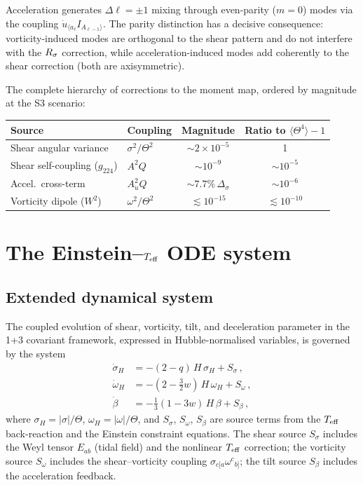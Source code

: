 Acceleration generates $\Delta\ell = \pm 1$ mixing through
even-parity ($m = 0$) modes via the coupling
$\dot{u}_{\langle a_\ell} I_{A_{\ell-1}\rangle}$.  The parity
distinction has a decisive consequence: vorticity-induced modes
are orthogonal to the shear pattern and do not interfere with
the $R_\sigma$ correction, while acceleration-induced modes add
coherently to the shear correction (both are axisymmetric).

The complete hierarchy of corrections to the moment map, ordered
by magnitude at the S3 scenario:
\begin{center}\footnotesize
\begin{tabular}{llcc}
\toprule
Source & Coupling & Magnitude
  & Ratio to $\langle\Theta^4\rangle - 1$ \\
\midrule
Shear angular variance & $\sigma^2/\Theta^2$ &
  $\sim 2 \times 10^{-5}$ & 1 \\
Shear self-coupling ($g_{224}$) & $A^2 Q$ &
  $\sim 10^{-9}$ & $\sim 10^{-5}$ \\
Accel.\ cross-term & $A_{\dot{u}}^2 Q$ &
  $\sim 7.7\%\,\Delta_\sigma$ & $\sim 10^{-6}$ \\
Vorticity dipole ($W^2$) & $\omega^2/\Theta^2$ &
  $\lesssim 10^{-15}$ & $\lesssim 10^{-10}$ \\
\bottomrule
\end{tabular}
\end{center}


\section{The Einstein--$T_{\mathrm{eff}}$ ODE system}\label{sec:teff-ode}\label{sec:transfer}

\subsection{Extended dynamical system}\label{sec:ode-system}

The coupled evolution of shear, vorticity, tilt, and
deceleration parameter in the 1+3 covariant framework, expressed
in Hubble-normalised variables, is governed by the system
\begin{align}
\dot{\sigma}_H &= -(2 - q)\,H\,\sigma_H + S_\sigma\,,
\label{eq:sigma-ode}\\
\dot{\omega}_H &= -(2 - \tfrac{3}{2}w)\,H\,\omega_H + S_\omega\,,
\label{eq:omega-ode}\\
\dot{\beta} &= -\tfrac{1}{3}(1 - 3w)\,H\,\beta + S_\beta\,,
\label{eq:beta-ode}
\end{align}
where $\sigma_H = |\sigma|/\Theta$,
$\omega_H = |\omega|/\Theta$, and $S_\sigma$, $S_\omega$,
$S_\beta$ are source terms from the $T_{\mathrm{eff}}$ back-reaction and
the Einstein constraint equations.  The shear source
$S_\sigma$ includes the Weyl tensor $E_{ab}$ (tidal field) and
the nonlinear $T_{\mathrm{eff}}$ correction; the vorticity source
$S_\omega$ includes the shear--vorticity coupling
$\sigma_{c[a}\omega^c{}_{b]}$; the tilt source $S_\beta$
includes the acceleration feedback.


